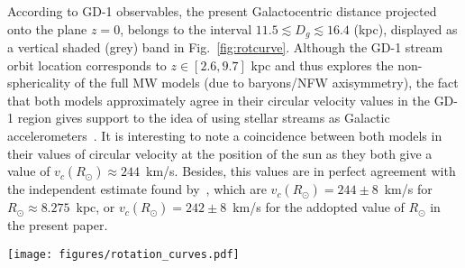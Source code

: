 \documentclass[twocolumn]{aa}
\begin{document}
According to GD-1 observables, the present Galactocentric distance projected onto the plane $z=0$,
belongs to the interval $11.5 \lesssim D_g \lesssim 16.4$ (kpc), displayed as a vertical shaded (grey) band in
Fig.~\ref{fig:rotcurve}.
Although the GD-1 stream orbit location corresponds to $z\in [2.6, 9.7]$ kpc and thus explores the non-sphericality of the full MW models (due to baryons/NFW axisymmetry), the fact that both models approximately agree in their circular velocity values in the GD-1 region gives support to the idea of using stellar streams as Galactic
accelerometers~\citep{Ibata_2016}.
It is interesting to note a coincidence between both models in their values of circular velocity
at the position of the sun as they both give a value of $v_c(R_\odot)\approx 244$~km/s.
Besides, this values are in perfect agreement with the independent estimate found
by~\citet{2020arXiv201202169B}, which are $v_c(R_\odot)=244\pm 8$~km/s for $R_\odot \approx 8.275$~kpc, or $v_c(R_\odot)=242\pm 8$~km/s for the addopted value of $R_\odot$ in the present paper.

\begin{figure*}
   \centering
   \texttt{[image: figures/rotation\_curves.pdf]}
   \caption{Rotation curve of MW models and observations: NFW-MW model in dotted (green), Fermionic-MW in dashed (amber),~\citet{sofue_rotation_2013} with squares (magenta),~\citet{Eilers_2019} with circles (blue) for~\citet{Eilers_2019} and~\citet{sofue_2020} with rhombus (light-blue). The region where the GD-1 stream is located at cero redshift is displayed with a vertical grey band.}
   \label{fig:rotcurve}
\end{figure*}
\end{document}
